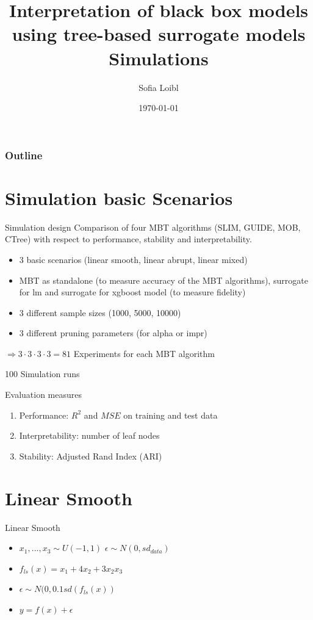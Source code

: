 \documentclass[9pt, xcolor=table]{beamer}
\title[Interpretation of black box models]{Interpretation of black box models using tree-based surrogate models \newline \small{Simulations}}
\author[Sofia Loibl]{Sofia Loibl}
\institute[LMU]{LMU München}
\date{\today}
\begin{document}
\begin{frame}
\titlepage 
\end{frame}


\begin{frame}
\frametitle{Outline} 
\tableofcontents 
\end{frame}


\section{Simulation basic Scenarios}
\begin{frame}{Simulation design}
Comparison of four MBT algorithms (SLIM, GUIDE, MOB, CTree)
with respect to performance, stability and interpretability.

\vspace{0.3cm}
\begin{itemize}
    \item 3 basic scenarios (linear smooth, linear abrupt, linear mixed)
    \item MBT as standalone (to measure accuracy of the MBT algorithms), surrogate for lm and surrogate for xgboost model (to measure fidelity)
    \item 3 different sample sizes (1000, 5000, 10000)
    \item 3 different pruning parameters (for alpha or impr)\end{itemize}
    
$\Rightarrow 3 \cdot 3 \cdot 3 \cdot 3 = 81$ Experiments for each MBT algorithm

\vspace{0.3cm}
100 Simulation runs

    
\end{frame}

\begin{frame}{Evaluation measures}
\begin{enumerate}
    \item Performance: $R^2$ and $MSE$ on training and test data
    \item Interpretability: number of leaf nodes
    \item Stability: Adjusted Rand Index (ARI)
\end{enumerate}
    
\end{frame}

\section{Linear Smooth}
\begin{frame}{Linear Smooth}
\begin{itemize}
    \item $x_1,..., x_3 \sim U(-1,1)$ $\epsilon \sim N(0, sd_{data})$
    \item $ f_{ls}(x) = x_1 + 4   x_2 + 3   x_2   x_3 $
    \item $\epsilon \sim N(0, 0.1 sd(f_{ls}(x))$
    \item $y = f(x) + \epsilon$
\end{itemize}

\end{frame}
\end{document}
